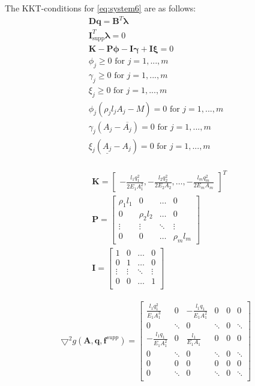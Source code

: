 

The KKT-conditions for \eqref{eq:system6} are as follows:
\begin{equation}
\label{KKT_system6}
\begin{aligned}
\bm{Dq} = \bm{B}^{T}\bm{\lambda}\\
\bm{I}^{T}_{\textrm{supp}}\bm{\lambda} = 0 \\
\bm{K} - \bm{P}\bm{\phi} - \bm{I}\bm{\gamma} + \bm{I}\bm{\xi} = 0 \\
\phi_j \geq 0  \text{ for } j = 1,...,m \\
\gamma_j \geq 0 \text{ for } j = 1,...,m \\
\xi_j \geq 0 \text{ for } j = 1,...,m \\
\phi_j(\rho_{j}l_{j}A_{j}-M) = 0 \text{ for } j = 1,...,m \\
\gamma_{j}(A_{j}-\overline{A_{j}}) = 0 \text{ for } j = 1,...,m \\
\xi_{j}(\underline{A_{j}}-A_{j}) = 0 \text{ for } j = 1,...,m \\
\end{aligned}
\end{equation}

\begin{align*}
&\bm{K} = \begin{bmatrix}
       -\frac{l_{1}q_{1}^2}{2E_{1}A_{1}^2}
       , -\frac{l_{2}q_{2}^2}{2E_{2}A_{2}}, \hdots,-\frac{l_{m}q_{m}^2}{2E_{m}A_{m}}
     \end{bmatrix}^T \\
&\bm{P} = \begin{bmatrix}
\rho_{1}l_{1} &  0  & \ldots & 0\\
0  &  \rho_{2}l_{2} & \ldots & 0\\
\vdots & \vdots & \ddots & \vdots\\
0  &   0       &\ldots & \rho_{m}l_{m}
\end{bmatrix}\\
&\bm{I} = \begin{bmatrix}
1 &  0  & \ldots & 0\\
0  &  1 & \ldots & 0\\
\vdots & \vdots & \ddots & \vdots\\
0  &   0  &\ldots & 1 \\
\end{bmatrix}
\end{align*}

\begin{align*}
\bm{\bigtriangledown}^2 g(\bm{A},\bm{q},\bm{f}^{supp}) =
\left[\begin{array}{cc|cc|cc}
\frac{l_1q_1^2}{E_1A_1^3}&0& -\frac{l_1q_1}{E_1A_1^2} &0 & 0 & 0\\[0.3em]
0 &\ddots &0 & \ddots & 0 & \ddots\\[0.3em] \hline
-\frac{l_1q_1}{E_1A_1^2} & 0 & \frac{l_1}{E_1A_1} & 0 & 0 & 0\\[0.3em]
0 &\ddots & 0 &\ddots & 0 & \ddots\\[0.3em] \hline
0 & 0 & 0 & 0 & 0 & 0 \\[0.3em]
0 & \ddots & 0 & \ddots & 0 & \ddots\\[0.3em]
\end{array}\right]
\end{align*}

